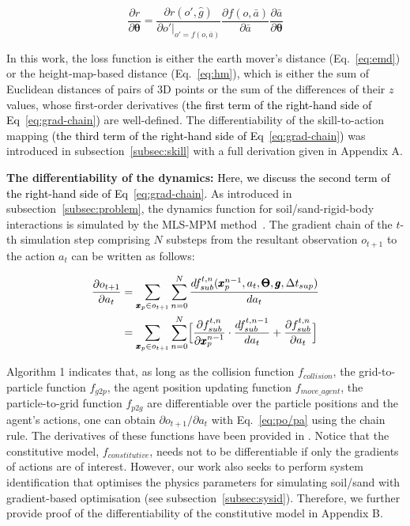 \documentclass[letterpaper, 10 pt, journal, twoside]{ieeetran}
\newcommand{\rp}[1]{\textcolor{black}{#1}}
\begin{document}
\begin{equation}
\frac{\partial r}{\partial \pmb{\theta}} = \frac{\partial r(o', \hat{g})}{\partial o'|_{o'=f(o,\bar{a})}}\frac{\partial f(o,\bar{a})}{\partial \bar{a}}\frac{\partial \bar{a}}{\partial \pmb{\theta}}\label{eq:grad-chain}
\end{equation}
 
In this work, the loss function is either the earth mover's distance (Eq.~\ref{eq:emd}) or the height-map-based distance (Eq.~\ref{eq:hm}), which is either the sum of Euclidean distances of pairs of 3D points or the sum of the differences of their $z$ values, whose first-order derivatives \rp{(the first term of the right-hand side of Eq~\ref{eq:grad-chain})} are well-defined. The differentiability of the skill-to-action mapping \rp{(the third term of the right-hand side of Eq~\ref{eq:grad-chain})} was introduced in subsection~\ref{subsec:skill} with a full derivation given in Appendix A.

\textbf{The differentiability of the dynamics:} \rp{Here, we discuss the second term of the right-hand side of Eq~\ref{eq:grad-chain}.} As introduced in subsection~\ref{subsec:problem}, the dynamics function for soil/sand-rigid-body interactions is simulated by the MLS-MPM method~\cite{hu2018moving}. 
The gradient chain of the $t$-th simulation step comprising $N$ substeps from the resultant observation $o_{t+1}$ to the action $a_t$ can be written as follows:

\begin{equation}\label{eq:po/pa}
\begin{split}
\frac{\partial o_{t+1}}{\partial a_t} 
&=\sum_{\pmb{x}_p\in o_{t+1}}\sum_{n=0}^N\frac{df_{sub}^{t,n}(\pmb{x}^{n-1}_p, a_t, \pmb{\Theta}, \pmb{g}, \Delta t_{sup})}{da_t}\\
&= \sum_{\pmb{x}_p\in o_{t+1}}\sum_{n=0}^N\Bigl[
\frac{\partial f_{sub}^{t,n}}{\partial \pmb{x}_p^{n-1}}\cdot
\frac{d f_{sub}^{t,n-1}}{d a_t} 
+ \frac{\partial f_{sub}^{t,n}}{\partial a_t}
\Bigr]    
\end{split}
\end{equation}

Algorithm 1 indicates that, as long as the collision function $f_{collision}$, the grid-to-particle function $f_{g2p}$, the agent position updating function $f_{move\_agent}$, the particle-to-grid function $f_{p2g}$ are differentiable over the particle positions and the agent's actions, one can obtain $\partial o_{t+1}/\partial a_t$ with Eq.~\ref{eq:po/pa} using the chain rule. The derivatives of these functions have been provided in \cite{hu2019chainqueen}. Notice that the constitutive model, $f_{constitutive}$, needs not to be differentiable if only the gradients of actions are of interest. However, our work also seeks to perform system identification that optimises the physics parameters for simulating soil/sand with gradient-based optimisation (see subsection~\ref{subsec:sysid}). Therefore, we further provide proof of the differentiability of the constitutive model in Appendix B.
\end{document}
